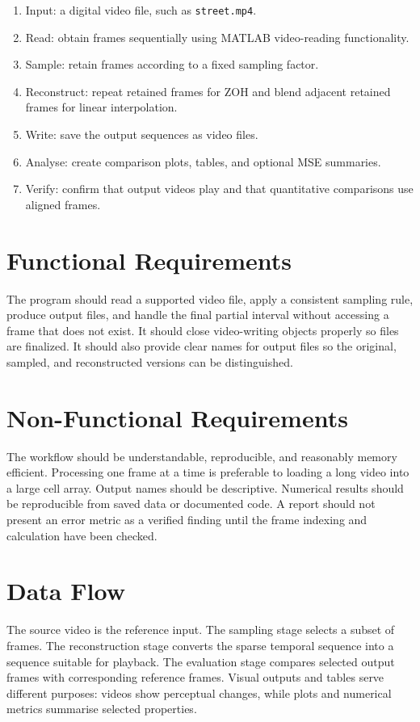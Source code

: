 \documentclass[12pt,a4paper,oneside]{report}
\begin{document}
\begin{enumerate}[leftmargin=*]
\item Input: a digital video file, such as \texttt{street.mp4}.
\item Read: obtain frames sequentially using MATLAB video-reading functionality.
\item Sample: retain frames according to a fixed sampling factor.
\item Reconstruct: repeat retained frames for ZOH and blend adjacent retained frames for linear interpolation.
\item Write: save the output sequences as video files.
\item Analyse: create comparison plots, tables, and optional MSE summaries.
\item Verify: confirm that output videos play and that quantitative comparisons use aligned frames.
\end{enumerate}

\section{Functional Requirements}
The program should read a supported video file, apply a consistent sampling rule, produce output files, and handle the final partial interval without accessing a frame that does not exist. It should close video-writing objects properly so files are finalized. It should also provide clear names for output files so the original, sampled, and reconstructed versions can be distinguished.

\section{Non-Functional Requirements}
The workflow should be understandable, reproducible, and reasonably memory efficient. Processing one frame at a time is preferable to loading a long video into a large cell array. Output names should be descriptive. Numerical results should be reproducible from saved data or documented code. A report should not present an error metric as a verified finding until the frame indexing and calculation have been checked.

\section{Data Flow}
The source video is the reference input. The sampling stage selects a subset of frames. The reconstruction stage converts the sparse temporal sequence into a sequence suitable for playback. The evaluation stage compares selected output frames with corresponding reference frames. Visual outputs and tables serve different purposes: videos show perceptual changes, while plots and numerical metrics summarise selected properties.
\end{document}
